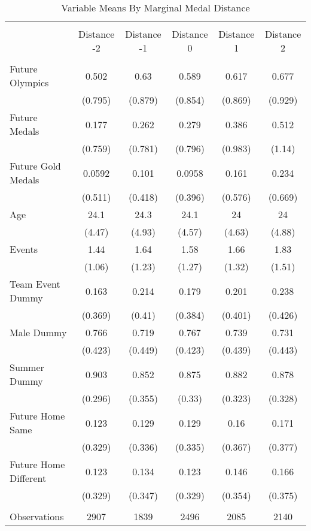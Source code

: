 
\begin{table}[!htbp] \centering 
  \caption{Variable Means By Marginal Medal Distance} 
  \label{} 
\small 
\begin{tabular}{@{\extracolsep{5pt}} lccccc} 
\\[-1.8ex]\hline \\[-1.8ex] 
 & Distance -2 & Distance -1 & Distance 0 & Distance 1 & Distance 2 \\ 
\hline 
\hline \\[-1.8ex] 
Future Olympics & 0.502 & 0.63 & 0.589 & 0.617 & 0.677 \\ 
 & (0.795) & (0.879) & (0.854) & (0.869) & (0.929) \\ 
Future Medals & 0.177 & 0.262 & 0.279 & 0.386 & 0.512 \\ 
  & (0.759) & (0.781) & (0.796) & (0.983) & (1.14) \\ 
Future Gold Medals & 0.0592 & 0.101 & 0.0958 & 0.161 & 0.234 \\ 
   & (0.511) & (0.418) & (0.396) & (0.576) & (0.669) \\ 
Age & 24.1 & 24.3 & 24.1 & 24 & 24 \\ 
    & (4.47) & (4.93) & (4.57) & (4.63) & (4.88) \\ 
Events & 1.44 & 1.64 & 1.58 & 1.66 & 1.83 \\ 
     & (1.06) & (1.23) & (1.27) & (1.32) & (1.51) \\ 
Team Event Dummy & 0.163 & 0.214 & 0.179 & 0.201 & 0.238 \\ 
      & (0.369) & (0.41) & (0.384) & (0.401) & (0.426) \\ 
Male Dummy & 0.766 & 0.719 & 0.767 & 0.739 & 0.731 \\ 
       & (0.423) & (0.449) & (0.423) & (0.439) & (0.443) \\ 
Summer Dummy & 0.903 & 0.852 & 0.875 & 0.882 & 0.878 \\ 
        & (0.296) & (0.355) & (0.33) & (0.323) & (0.328) \\ 
Future Home Same & 0.123 & 0.129 & 0.129 & 0.16 & 0.171 \\ 
         & (0.329) & (0.336) & (0.335) & (0.367) & (0.377) \\ 
Future Home Different & 0.123 & 0.134 & 0.123 & 0.146 & 0.166 \\ 
          & (0.329) & (0.347) & (0.329) & (0.354) & (0.375) \\ 
           &  &  &  &  &  \\ 
Observations & 2907 & 1839 & 2496 & 2085 & 2140 \\ 

\end{tabular}
\end{table}
